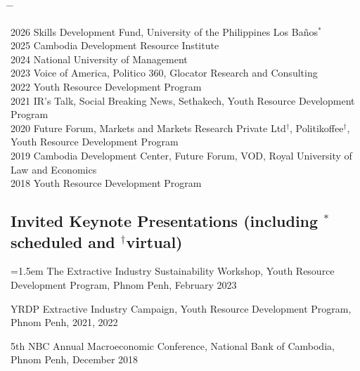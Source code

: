 \documentclass[10pt,a4paper]{article}
\newcommand{\tabbedblock}[1]{

	\begin{tabbing}
		\hspace{1.4cm} \= \hspace{4cm} \= \kill
		#1
	\end{tabbing}
}
\begin{document}
\tabbedblock{
	2026 \> Skills Development Fund, University of the Philippines Los Baños$^\ast$\\ 
	
	2025 \> Cambodia Development Resource Institute\\ 
	
	2024 \> National University of Management\\ 
	
	2023 \> Voice of America, Politico 360, Glocator Research and Consulting \\
		
	2022  \>  Youth Resource Development Program \\
	
	
	2021  \>  IR’s Talk, Social Breaking News, Sethakech, Youth Resource Development Program \\
	
	2020 \>  Future Forum, Markets and Markets Research Private Ltd$^\dag$, Politikoffee$^\dag$, \\
	\> Youth Resource Development Program \\
	
	2019 \> Cambodia Development Center, Future Forum, VOD, Royal University of Law and Economics \\
	
	2018 \> Youth Resource Development Program
}
	
	
\subsection*{Invited Keynote Presentations (including $^\ast$scheduled and $^\dag$virtual)}

\hangindent=1.5em
The Extractive Industry Sustainability Workshop, Youth Resource Development Program, Phnom Penh, February 2023

YRDP Extractive Industry Campaign, Youth Resource Development Program, Phnom Penh, 2021, 2022

5th NBC Annual Macroeconomic Conference, National Bank of Cambodia, Phnom Penh, December 2018


\end{document}
